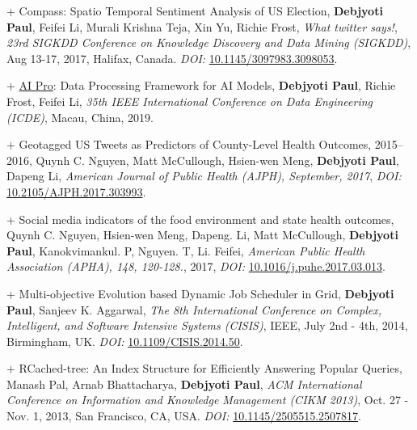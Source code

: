 \documentclass[8pt]{article}
\makeatletter
\newlength{\bibhang}
\newlength{\bibsep}
 {\@listi \global\bibsep\itemsep \global\advance\bibsep by\parsep}
\newenvironment{bibsection}%
        {\vspace{-\baselineskip}\begin{list}{}{%
       \setlength{\leftmargin}{\bibhang}%
       \setlength{\itemindent}{-\leftmargin}%
       \setlength{\itemsep}{\bibsep}%
       \setlength{\parsep}{\z@}%
        \setlength{\partopsep}{0pt}%
        \setlength{\topsep}{0pt}}}
        {\end{list}\vspace{-.6\baselineskip}}
\makeatother
\begin{document}
\begin{bibsection}
\item[+] Compass: Spatio Temporal Sentiment Analysis of US Election, \textbf{Debjyoti Paul}, Feifei Li, Murali Krishna Teja, Xin Yu, Richie Frost,  \textit{What twitter says!}, \emph{23rd SIGKDD Conference on Knowledge Discovery and Data Mining (SIGKDD)}, Aug 13-17, 2017, Halifax, Canada. \textit{DOI:} \href{https://dx.doi.org/10.1145/3097983.3098053}{10.1145/3097983.3098053}.
\item[+] \href{https://www.cs.utah.edu/~deb/aipro/}{AI Pro}: Data Processing Framework for AI Models, \textbf{Debjyoti Paul}, Richie Frost, Feifei Li, \emph{35th IEEE International Conference on Data Engineering (ICDE)}, Macau, China, 2019.
\item[+] Geotagged US Tweets as Predictors of County-Level Health Outcomes, 2015–2016, Quynh C. Nguyen, Matt McCullough, Hsien-wen Meng, \textbf{Debjyoti Paul}, Dapeng Li,  \emph{American Journal of Public Health (AJPH), September, 2017}, \textit{DOI:} \href{https://dx.doi.org/10.2105/AJPH.2017.303993}{10.2105/AJPH.2017.303993}.
\item[+] Social media indicators of the food environment and state health outcomes, Quynh C. Nguyen, Hsien-wen Meng, Dapeng. Li, Matt McCullough, \textbf{Debjyoti Paul}, Kanokvimankul. P, Nguyen. T, Li. Feifei, \emph{ American Public Health Association (APHA), 148, 120-128.}, 2017, \textit{DOI:} \href{https://dx.doi.org/10.1016/j.puhe.2017.03.013}{10.1016/j.puhe.2017.03.013}.
\item[+] Multi-objective Evolution based Dynamic Job Scheduler in Grid, \textbf{Debjyoti Paul}, Sanjeev K. Aggarwal,  \emph{The 8th International Conference on Complex, Intelligent, and Software Intensive Systems (CISIS)}, IEEE, July 2nd - 4th, 2014, Birmingham, UK. \textit{DOI:} \href{https://dx.doi.org/10.1109/CISIS.2014.50}{10.1109/CISIS.2014.50}.
\item[+] RCached-tree: An Index Structure for Efficiently Answering Popular Queries, Manash Pal, Arnab Bhattacharya, \textbf{Debjyoti Paul}, \emph{ACM International Conference on Information and Knowledge Management (CIKM 2013)}, Oct. 27 - Nov. 1, 2013, San Francisco, CA, USA. \textit{DOI:}  \href{https://dx.doi.org/10.1145/2505515.2507817}{10.1145/2505515.2507817}.
\end{bibsection}
\end{document}
